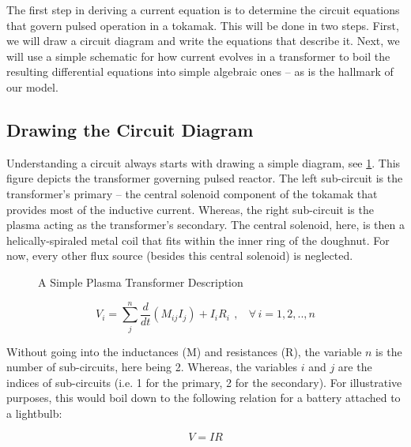 The first step in deriving a current equation is to determine the circuit equations that govern pulsed operation in a tokamak. This will be done in two steps. First, we will draw a circuit diagram and write the equations that describe it. Next, we will use a simple schematic for how current evolves in a transformer to boil the resulting differential equations into simple algebraic ones -- as is the hallmark of our model.

\subsection{Drawing the Circuit Diagram}

Understanding a circuit always starts with drawing a simple diagram, see \cref{fig:circuit_diagram}. This figure depicts the transformer governing pulsed reactor. The left sub-circuit is the transformer's primary -- the central solenoid component of the tokamak that provides most of the inductive current. Whereas, the right sub-circuit is the plasma acting as the transformer's secondary. The central solenoid, here, is then a helically-spiraled metal coil that fits within the inner ring of the doughnut. For now, every other flux source (besides this central solenoid) is neglected.

\begin{figure}[]
\centering

\caption{A Simple Plasma Transformer Description}
\label{fig:circuit_diagram}
\end{figure}


\begin{equation}
	V_i = \sum_j^n \frac{d}{dt} \left( M_{ij} I_j \right) + I_i R_i \ \, , \ \ \ \ \forall \, i = 1,2,..,n
\end{equation}

Without going into the inductances (M) and resistances (R), the variable $n$ is the number of sub-circuits, here being 2. Whereas, the variables $i$ and $j$ are the indices of sub-circuits (i.e. 1 for the primary, 2 for the secondary). For illustrative purposes, this would boil down to the following relation for a battery attached to a lightbulb:

\begin{equation}
	V = I R
\end{equation}

